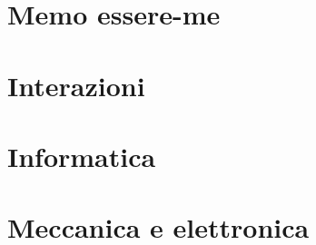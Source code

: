 \documentclass[oneside,21pt,fleqn]{memoir}%
\newcounter{cherrychapter}%
\begin{document}
%
%
%
%
%
%
%
\part{Memo essere-me}
\part{Interazioni}
\part{Informatica}
\PartialToc
\listofkeywords

\part{Meccanica e elettronica}

%
\end{document}
